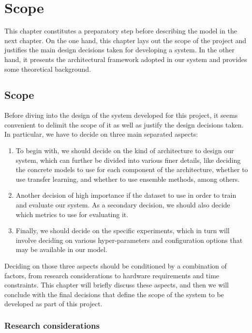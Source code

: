 \chapter{Scope}
\label{ch:scope}

This chapter constitutes a preparatory step before describing the model in the next chapter. On the one hand, this chapter lays out the scope of the project and justifies the main design decisions taken for developing a system. In the other hand, it presents the architectural framework adopted in our system and provides some theoretical background.

\section{Scope}\label{sec:scope}

Before diving into the design of the system developed for this project, it seems convenient to delimit the scope of it as well as justify the design decisions taken. In particular, we have to decide on three main separated aspects:

\begin{enumerate}
\item To begin with, we should decide on the kind of architecture to design our system, which can further be divided into various finer details, like deciding the concrete models to use for each component of the architecture, whether to use transfer learning, and whether to use ensemble methods, among others.
\item Another decision of high importance if the dataset to use in order to train and evaluate our system. As a secondary decision, we should also decide which metrics to use for evaluating it.
\item Finally, we should decide on the specific experiments, which in turn will involve deciding on various hyper-parameters and configuration options that may be available in our model.
\end{enumerate}

Deciding on those three aspects should be conditioned by a combination of factors, from research considerations to hardware requirements and time constraints. This chapter will briefly discuss these aspects, and then we will conclude with the final decisions that define the scope of the system to be developed as part of this project.

\subsection{Research considerations}

